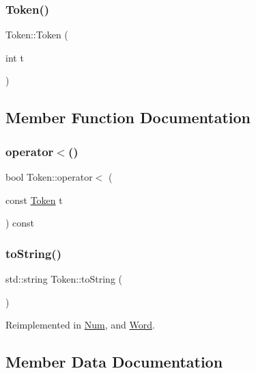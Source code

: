 \subsubsection{\texorpdfstring{Token()}{Token()}}
{\footnotesize\ttfamily Token\+::\+Token (\begin{DoxyParamCaption}\item[{int}]{t }\end{DoxyParamCaption})}



\subsection{Member Function Documentation}
\mbox{\label{class_token_a745ea87ba20ab7e4d3f9061c62c179ca}} 
\subsubsection{\texorpdfstring{operator$<$()}{operator<()}}
{\footnotesize\ttfamily bool Token\+::operator$<$ (\begin{DoxyParamCaption}\item[{const \hyperlink{class_token}{Token}}]{t }\end{DoxyParamCaption}) const\hspace{0.3cm}{\ttfamily [inline]}}

\mbox{\label{class_token_a8863381edabce7bc1e92473b445ba81f}} 
\subsubsection{\texorpdfstring{to\+String()}{toString()}}
{\footnotesize\ttfamily std\+::string Token\+::to\+String (\begin{DoxyParamCaption}{ }\end{DoxyParamCaption})\hspace{0.3cm}{\ttfamily [virtual]}}



Reimplemented in \hyperlink{class_num_aec8ab507b42f2080a8cc197f45f0c935}{Num}, and \hyperlink{class_word_a950a81bfd0fc369b0eb8d0d6b27e2870}{Word}.



\subsection{Member Data Documentation}
\mbox{\label{class_token_a4b96c2a31d7c374fd2bd1986794f80dd}} 
